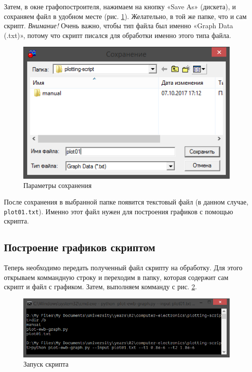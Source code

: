 \documentclass[a4paper,oneside,DIV=10,12pt]{scrartcl}
\newcommand\filename[1]{\texttt{#1}}
\begin{document}
		Затем, в окне графопостроителя, нажимаем на кнопку «Save As» (дискета), и сохраняем файл в удобном месте (рис. \ref{fig:saving}). Желательно, в той же папке, что и сам скрипт. \emph{Внимание!} Очень важно, чтобы тип файла был именно «Graph Data (.txt)», потому что скрипт писался для обработки именно этого типа файла.
		
		\begin{figure}[H]
			\centering
			\includegraphics[]{step03.png}
			\caption{Параметры сохранения}
			\label{fig:saving} 
		\end{figure}
		
		После сохранения в выбранной папке появится текстовый файл (в данном случае, \filename{plot01.txt}). Именно этот файл нужен для построения графиков с помощью скрипта.
		
		\subsection{Построение графиков скриптом}
		Теперь необходимо передать полученный файл скрипту на обработку. Для этого открываем коммандную строку и переходим в папку, которая содержит сам скрипт и файл с графиком. Затем, выполняем комманду с рис. \ref{fig:cmd}.
		
		\begin{figure}[H]
			\centering
			\includegraphics[width=\textwidth]{step04-1.png}
			\caption{Запуск скрипта}
			\label{fig:cmd} 
		\end{figure}
		
\end{document}

